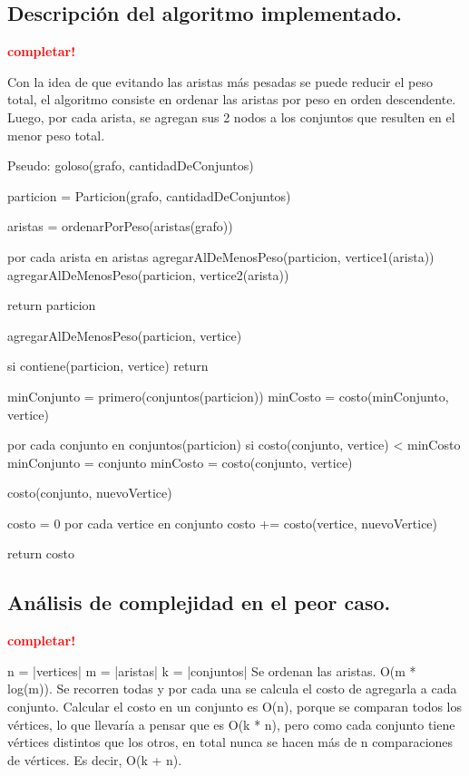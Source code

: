 \subsection{Descripción del algoritmo implementado.}
\vspace*{0.3cm}

\textcolor{red}{\textbf{completar!}}

Con la idea de que evitando las aristas más pesadas se puede reducir el peso
total, el algoritmo consiste en ordenar las aristas por peso en orden
descendente. Luego, por cada arista, se agregan sus 2 nodos a los conjuntos que
resulten en el menor peso total.

Pseudo:
goloso(grafo, cantidadDeConjuntos) {
	particion = Particion(grafo, cantidadDeConjuntos)

	aristas = ordenarPorPeso(aristas(grafo))

	por cada arista en aristas {
		agregarAlDeMenosPeso(particion, vertice1(arista))
		agregarAlDeMenosPeso(particion, vertice2(arista))
	}

	return particion
}

agregarAlDeMenosPeso(particion, vertice) {
	si contiene(particion, vertice)
		return

	minConjunto = primero(conjuntos(particion))
	minCosto = costo(minConjunto, vertice)

	por cada conjunto en conjuntos(particion) {
		si costo(conjunto, vertice) < minCosto {
			minConjunto = conjunto
			minCosto = costo(conjunto, vertice)
		}
	}
}

costo(conjunto, nuevoVertice) {
	costo = 0
	por cada vertice en conjunto {
		costo += costo(vertice, nuevoVertice)
	}

	return costo
}


\newpage
\subsection{Análisis de complejidad en el peor caso.}
\vspace*{0.3cm}

\textcolor{red}{\textbf{completar!}}

n = |vertices|
m = |aristas|
k = |conjuntos|
Se ordenan las aristas. O(m * log(m)).
Se recorren todas y por cada una se calcula el costo de agregarla a cada
conjunto. Calcular el costo en un conjunto es O(n), porque se comparan todos
los vértices, lo que llevaría a pensar que es O(k * n), pero como cada
conjunto tiene vértices distintos que los otros, en total nunca se hacen más
de n comparaciones de vértices. Es decir, O(k + n).

